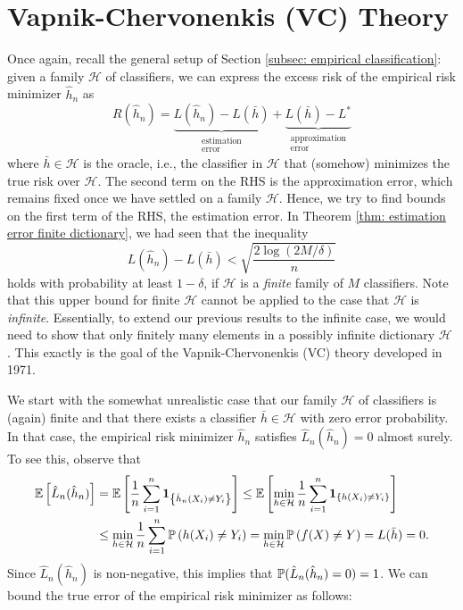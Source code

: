 \chapter{Vapnik-Chervonenkis (VC) Theory}
\label{ch: VC theory}

Once again, recall the general setup of Section \ref{subsec: empirical classification}: given a family $\mathcal{H}$ of classifiers, we can express the excess risk of the empirical risk minimizer $\hat h_n$ as
\[
    R(\hat h_n) = \underbrace{L(\hat h_n) - L(\bar h)}_{\substack{\text{estimation} \\ \text{error}}} + \underbrace{L(\bar h) - L^*}_{\substack{\text{approximation} \\ \text{error}}}
\]
where $\bar h \in \mathcal{H}$ is the oracle, i.e., the classifier in $\mathcal{H}$ that (somehow) minimizes the true risk over $\mathcal{H}$. The second term on the RHS is the approximation error, which remains fixed once we have settled on a family $\mathcal{H}$. Hence, we try to find bounds on the first term of the RHS, the estimation error. In Theorem \ref{thm: estimation error finite dictionary}, we had seen that the inequality
\[
    L(\hat h_n) - L(\bar h) < \sqrt{\frac{2 \log(2M / \delta)}{n}}
\]
holds with probability at least $1 - \delta$, if $\mathcal{H}$ is a \emph{finite} family of $M$ classifiers. Note that this upper bound for finite $\mathcal{H}$ cannot be applied to the case that $\mathcal{H}$ is \emph{infinite}. Essentially, to extend our previous results to the infinite case, we would need to show that only finitely many elements in a possibly infinite dictionary $\mathcal{H}$ . This exactly is the goal of the Vapnik-Chervonenkis (VC) theory developed in 1971.

We start with the somewhat unrealistic case that our family $\mathcal{H}$ of classifiers is (again) finite and that there exists a classifier $\bar h \in \mathcal{H}$ with zero error probability. In that case, the empirical risk minimizer $\hat h_n$ satisfies $\hat L_n(\hat h_n) = 0$ almost surely. To see this, observe that
\begin{align*}
    \Ex{\hat L_n(\hat h_n)} &= \Ex{\frac{1}{n} \sum_{i=1}^n \indSet{\hat h_n(X_i) \neq Y_i}} \leq \Ex{\min_{h \in \mathcal{H}} \frac{1}{n} \sum_{i=1}^n \indSet{h(X_i) \neq Y_i}} \\
        &\leq \min_{h \in \mathcal{H}} \frac{1}{n} \sum_{i=1}^n \Pr{h(X_i) \neq Y_i} = \min_{h \in \mathcal{H}} \Pr{f(X) \neq Y} = L(\bar h) = 0.
\end{align*}
Since $\hat L_n(\hat h_n)$ is non-negative, this implies that $\P(\hat L_n(\hat h_n) = 0) = 1$. We can bound the true error of the empirical risk minimizer as follows:

